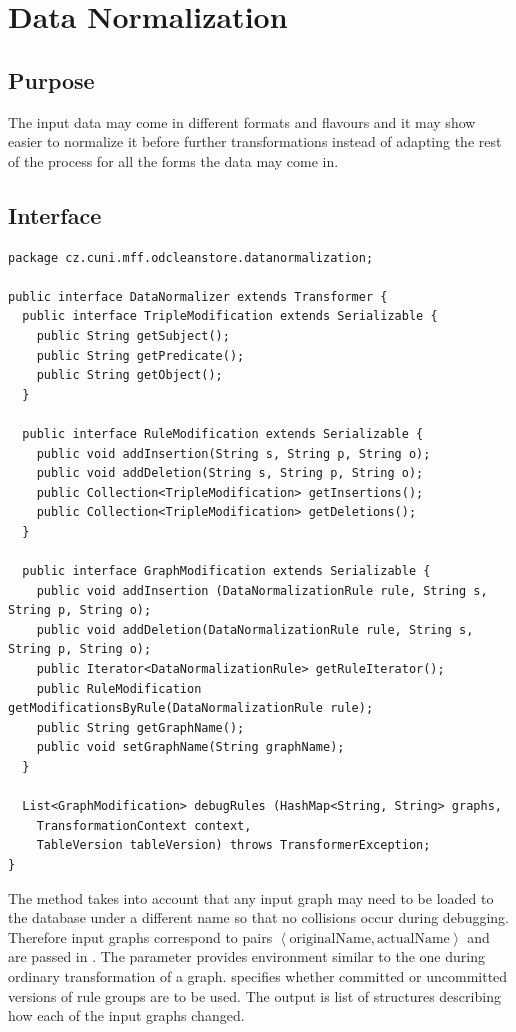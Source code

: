 \section{Data Normalization}
\label{sec:DN}

\subsection{Purpose}

The input data may come in different formats and flavours and it may show easier to normalize it before further transformations instead of adapting the rest of the process for all the forms the data may come in.

\subsection{Interface}

\begin{lstlisting}[caption=Data Normalizer interface,label=lst:dataNormalizer]
package cz.cuni.mff.odcleanstore.datanormalization;

public interface DataNormalizer extends Transformer {
  public interface TripleModification extends Serializable {
    public String getSubject();
    public String getPredicate();
    public String getObject();
  }

  public interface RuleModification extends Serializable {
    public void addInsertion(String s, String p, String o);
    public void addDeletion(String s, String p, String o);
    public Collection<TripleModification> getInsertions();
    public Collection<TripleModification> getDeletions();
  }

  public interface GraphModification extends Serializable {
    public void addInsertion (DataNormalizationRule rule, String s, String p, String o);
    public void addDeletion(DataNormalizationRule rule, String s, String p, String o);
    public Iterator<DataNormalizationRule> getRuleIterator();
    public RuleModification getModificationsByRule(DataNormalizationRule rule);
    public String getGraphName();
    public void setGraphName(String graphName);
  }

  List<GraphModification> debugRules (HashMap<String, String> graphs,
    TransformationContext context,
    TableVersion tableVersion) throws TransformerException;
}
\end{lstlisting}

The method  takes into account that any input graph may need to be loaded to the database under a different name so that no collisions occur during debugging. Therefore input graphs correspond to pairs $ \left< \text{originalName}, \text{actualName} \right> $ and are passed in . The  parameter provides environment similar to the one during ordinary transformation of a graph.  specifies whether committed or uncommitted versions of rule groups are to be used. The output is list of  structures describing how each of the input graphs changed.

